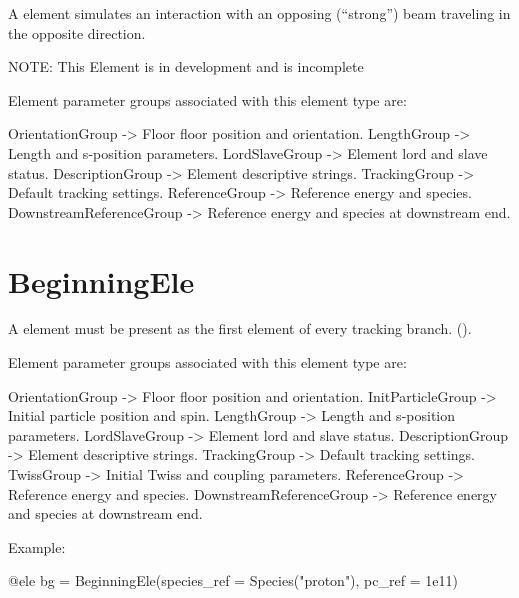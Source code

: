 A  element simulates an interaction with an opposing
(``strong'') beam traveling in the opposite direction.

NOTE: This Element is in development and is incomplete

Element parameter groups associated with this element type are:
\TOPrule
\begin{example}
  OrientationGroup -> Floor floor position and orientation.  
  LengthGroup        -> Length and s-position parameters.  
  LordSlaveGroup     -> Element lord and slave status.  
  DescriptionGroup   -> Element descriptive strings.  
  TrackingGroup      -> Default tracking settings.  
  ReferenceGroup     -> Reference energy and species. 
  DownstreamReferenceGroup -> Reference energy and species at downstream end. 
\end{example}
\BOTTOMrule


\newpage

\section{BeginningEle}
\label{s:begin.ele}

A  element must be present as the first element of every tracking branch.
().

Element parameter groups associated with this element type are:
\TOPrule
\begin{example}
  OrientationGroup -> Floor floor position and orientation.  
  InitParticleGroup  -> Initial particle position and spin.  
  LengthGroup        -> Length and s-position parameters.  
  LordSlaveGroup     -> Element lord and slave status.  
  DescriptionGroup   -> Element descriptive strings.  
  TrackingGroup      -> Default tracking settings.  
  TwissGroup         -> Initial Twiss and coupling parameters.  
  ReferenceGroup     -> Reference energy and species. 
  DownstreamReferenceGroup -> Reference energy and species at downstream end. 
\end{example}
\BOTTOMrule


Example:
\begin{example}
  @ele bg = BeginningEle(species_ref = Species("proton"), pc_ref = 1e11)
\end{example}

